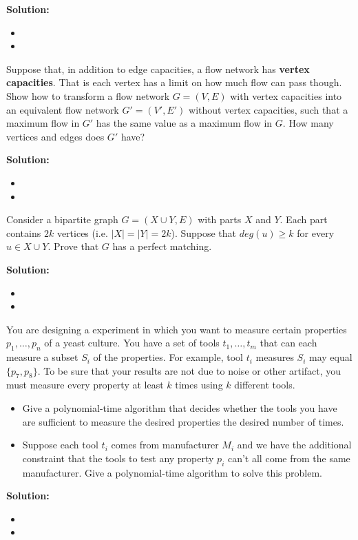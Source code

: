 \documentclass{article}
\newcounter{exercise}
\newcommand{\<}{
    \langle}
\renewcommand{\>}{
    \rangle}
\begin{document}
{\textbf{Solution:}
\begin{itemize}
    \item 
    \item 
\end{itemize}



\begin{exercise}
Suppose that, in addition to edge capacities, a flow network has \textbf{vertex capacities}.
That is each vertex has a limit on how much flow can pass though. Show how to transform a flow network $G=(V,E)$ with vertex capacities into an equivalent flow network $G'=(V',E')$ without vertex capacities, such that a maximum flow in $G'$ has the same value as a maximum flow in $G$. How many vertices and edges does $G'$ have?
\end{exercise}

\textbf{Solution:}
\begin{itemize}
    \item 
    \item 
\end{itemize}




\begin{exercise}
Consider a bipartite graph $G=(X\cup Y,E)$ with parts $X$ and $Y$. Each part contains $2k$ vertices (i.e. $|X|=|Y|=2k$). Suppose that $deg(u)\geq k$ for every $u\in X\cup Y$. Prove that $G$ has a perfect matching.
\end{exercise}

\textbf{Solution:}
\begin{itemize}
    \item 
    \item 
\end{itemize}




\begin{exercise}
You are designing a experiment in which you want to measure certain properties $p_1,\ldots ,p_n$ of a yeast culture. You have a set of tools $t_1,\ldots ,t_m$ that can each measure a subset $S_i$ of the properties. For example, tool $t_i$ measures $S_i$ may equal $\{p_7,p_8\}$. To be sure that your results are not due to noise or other artifact, you must measure every property at least $k$ times using $k$ different tools.
\begin{itemize}
\item Give a polynomial-time algorithm that decides whether the tools you have are sufficient to measure the desired properties the desired number of times.
\item Suppose each tool $t_i$ comes from manufacturer $M_i$ and we have the additional constraint that the tools to test any property $p_i$ can't all come from the same manufacturer. Give a polynomial-time algorithm to solve this problem.
\end{itemize}
\end{exercise}
\textbf{Solution:}
\begin{itemize}
    \item 
    \item 
\end{itemize}




}
\end{document}
